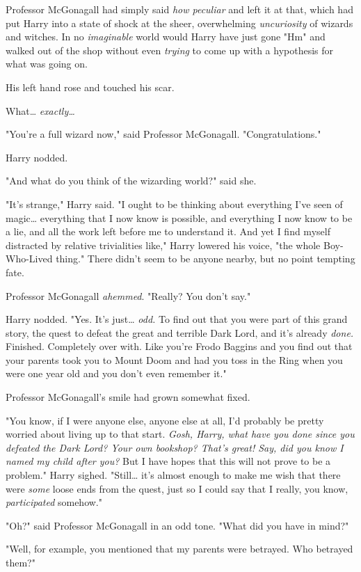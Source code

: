 Professor McGonagall had simply said \emph{how peculiar} and left it at that,
which had put Harry into a state of shock at the sheer, overwhelming
\emph{uncuriosity} of wizards and witches. In no \emph{imaginable} world would
Harry have just gone "Hm" and walked out of the shop without even \emph{trying}
to come up with a hypothesis for what was going on.

His left hand rose and touched his scar.

What{\ldots} \emph{exactly{\ldots}}

"You're a full wizard now," said Professor McGonagall. "Congratulations."

Harry nodded.

"And what do you think of the wizarding world?" said she.

"It's strange," Harry said. "I ought to be thinking about everything I've seen
of magic{\ldots} everything that I now know is possible, and everything I now
know to be a lie, and all the work left before me to understand it. And yet I
find myself distracted by relative trivialities like," Harry lowered his voice,
"the whole Boy-Who-Lived thing." There didn't seem to be anyone nearby, but no
point tempting fate.

Professor McGonagall \emph{ahemmed}. "Really? You don't say."

Harry nodded. "Yes. It's just{\ldots} \emph{odd.} To find out that you were
part of this grand story, the quest to defeat the great and terrible Dark Lord,
and it's already \emph{done.} Finished. Completely over with. Like you're Frodo
Baggins and you find out that your parents took you to Mount Doom and had you
toss in the Ring when you were one year old and you don't even remember it."

Professor McGonagall's smile had grown somewhat fixed.

"You know, if I were anyone else, anyone else at all, I'd probably be pretty
worried about living up to that start. \emph{Gosh, Harry, what have you done
since you defeated the Dark Lord? Your own bookshop? That's great! Say, did you
know I named my child after you?} But I have hopes that this will not prove to
be a problem." Harry sighed. "Still{\ldots} it's almost enough to make me wish
that there were \emph{some} loose ends from the quest, just so I could say that
I really, you know, \emph{participated} somehow."

"Oh?" said Professor McGonagall in an odd tone. "What did you have in mind?"

"Well, for example, you mentioned that my parents were betrayed. Who betrayed
them?"

